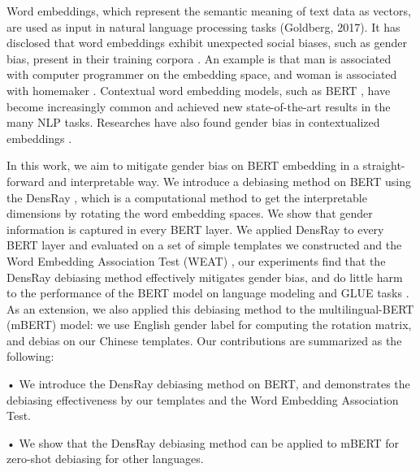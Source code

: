 Word embeddings, which represent the semantic meaning of text data as vectors, are used as input in natural language processing tasks (Goldberg, 2017). It has disclosed that word embeddings exhibit unexpected social biases, such as gender bias, present in their training corpora \citep{bolukbasi2016man, caliskan2017semantics,garg2018word}. An example is that man is associated with computer programmer on the embedding space, and woman is associated with homemaker \citep{bolukbasi2016man}. Contextual word embedding models, such as BERT \citep{devlin2018bert}, have become increasingly common and achieved new state-of-the-art results in the many NLP tasks. Researches have also found gender bias in contextualized embeddings \citep{zhao2019gender,may2019measuring}.

In this work, we aim to mitigate gender bias on BERT embedding in a straight-forward and interpretable way. We introduce a debiasing method on BERT using the DensRay \citep{dufter2019analytical}, which is a computational method to get the interpretable dimensions by rotating the word embedding spaces. We show that gender information is captured in every BERT layer. We applied DensRay to every BERT layer and evaluated on a set of simple templates we constructed and the Word Embedding Association Test (WEAT) \citep{caliskan2017semantics}, our experiments find that the DensRay debiasing method effectively mitigates gender bias, and do little harm to the performance of the BERT model on language modeling and GLUE tasks \citep{wang2018glue}. As an extension, we also applied this debiasing method to the multilingual-BERT (mBERT) model: we use English gender label for computing the rotation matrix, and debias on our Chinese templates. Our contributions are summarized as the following: 

• We introduce the DensRay debiasing method on BERT, and demonstrates the debiasing effectiveness by our templates and the Word Embedding Association Test.

• We show that the DensRay debiasing method can be applied to mBERT for zero-shot debiasing for other languages.